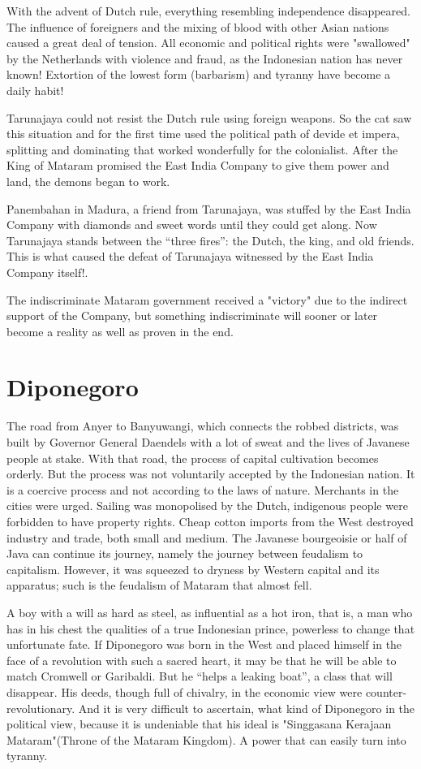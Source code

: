 With the advent of Dutch rule, everything resembling independence disappeared. The influence of 
foreigners and the mixing of blood with other Asian nations caused a great deal of tension. All 
economic and political rights were "swallowed" by the Netherlands with violence and fraud, as the 
Indonesian nation has never known! Extortion of the lowest form (barbarism) and tyranny have become a daily habit!\nline

Tarunajaya could not resist the Dutch rule using foreign weapons. So the cat saw this situation and 
for the first time used the political path of devide et impera, splitting and dominating that worked 
wonderfully for the colonialist. After the King of Mataram promised the East India Company to give 
them power and land, the demons began to work.\nline

Panembahan in Madura, a friend from Tarunajaya, was stuffed by the East India Company with diamonds 
and sweet words until they could get along. Now Tarunajaya stands between the “three fires”: the Dutch, 
the king, and old friends. This is what caused the defeat of Tarunajaya witnessed by the East India Company itself!.\nline

The indiscriminate Mataram government received a "victory" due to the indirect support of the Company, but 
something indiscriminate will sooner or later become a reality as well as proven in the end.\nline

\section{Diponegoro}

The road from Anyer to Banyuwangi, which connects the robbed districts, was built by Governor General 
Daendels with a lot of sweat and the lives of Javanese people at stake. With that road, 
the process of capital cultivation becomes orderly. But the process was not voluntarily accepted by 
the Indonesian nation. It is a coercive process and not according to the laws of nature. Merchants in 
the cities were urged. Sailing was monopolised by the Dutch, indigenous people were forbidden to 
have property rights. Cheap cotton imports from the West destroyed industry and trade, both 
small and medium. The Javanese bourgeoisie or half of Java can continue its journey, namely 
the journey between feudalism to capitalism. However, it was squeezed to dryness by Western 
capital and its apparatus; such is the feudalism of Mataram that almost fell.\nline

A boy with a will as hard as steel, as influential as a hot iron, that is, a man who has 
in his chest the qualities of a true Indonesian prince, powerless to change that 
unfortunate fate. If Diponegoro was born in the West and placed himself in the face of 
a revolution with such a sacred heart, it may be that he will be able to match Cromwell 
or Garibaldi. But he “helps a leaking boat”, a class that will disappear. His deeds, 
though full of chivalry, in the economic view were counter-revolutionary. And it is 
very difficult to ascertain, what kind of Diponegoro in the political view, because it 
is undeniable that his ideal is "Singgasana Kerajaan Mataram"(Throne of the Mataram Kingdom). 
A power that can easily turn into tyranny.\nline

